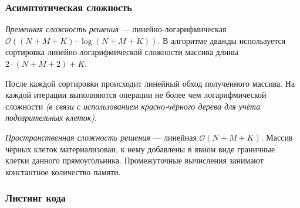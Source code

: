 \subsubsection{Асимптотическая сложность}

\textit{Временная сложность решения} --- линейно-логарифмическая \( \mathcal{O}((N+M+K)\cdot\log(N+M+K)) \). В алгоритме дважды используется сортировка линейно-логарифмической сложности массива длины \( 2\cdot(N+M+2)+K \).

После каждой сортировки происходит линейный обход полученного массива. На каждой итерации выполняются операции не более чем логарифмической сложности \textit{(в связи с использованием красно-чёрного дерева для учёта подозрительных клеток)}.

\textit{Пространственная сложность решения} --- линейная \( \mathcal{O}(N+M+K) \). Массив чёрных клеток материализован, к нему добавлены в явном виде граничные клетки данного прямоугольника. Промежуточные вычисления занимают константное количество памяти.

\subsubsection{Листинг кода}


